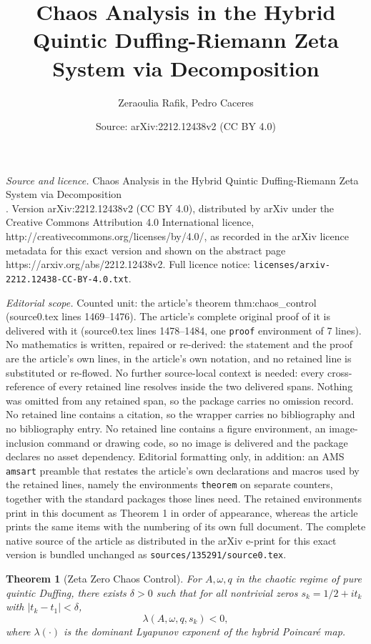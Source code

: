 \documentclass[10pt,a4paper]{amsart}
\title{Chaos Analysis in the Hybrid Quintic Duffing-Riemann Zeta System via Decomposition\\}
\author{Zeraoulia Rafik, Pedro Caceres}
\date{Source: arXiv:2212.12438v2 (CC BY 4.0)}
\newtheorem{theorem}{Theorem}
\begin{document}
\maketitle

\noindent\emph{Source and licence.} Chaos Analysis in the Hybrid Quintic Duffing-Riemann Zeta System via Decomposition\\. Version arXiv:2212.12438v2 (CC BY 4.0), distributed by arXiv under the Creative Commons Attribution 4.0 International licence, http://creativecommons.org/licenses/by/4.0/, as recorded in the arXiv licence metadata for this exact version and shown on the abstract page https://arxiv.org/abs/2212.12438v2. Full licence notice: \texttt{licenses/arxiv-2212.12438-CC-BY-4.0.txt}.\par\smallskip

\noindent\textit{Editorial scope.} Counted unit: the article's theorem thm:chaos\_control (source0.tex lines 1469--1476). The article's complete original proof of it is delivered with it (source0.tex lines 1478--1484, one \texttt{proof} environment of 7 lines). No mathematics is written, repaired or re-derived: the statement and the proof are the article's own lines, in the article's own notation, and no retained line is substituted or re-flowed.  No further source-local context is needed: every cross-reference of every retained line resolves inside the two delivered spans.  Nothing was omitted from any retained span, so the package carries no omission record.  No retained line contains a citation, so the wrapper carries no bibliography and no bibliography entry.  No retained line contains a figure environment, an image-inclusion command or drawing code, so no image is delivered and the package declares no asset dependency.  Editorial formatting only, in addition: an AMS \texttt{amsart} preamble that restates the article's own declarations and macros used by the retained lines, namely the environments \texttt{theorem} on separate counters, together with the standard packages those lines need.  The retained environments print in this document as Theorem 1 in order of appearance, whereas the article prints the same items with the numbering of its own full document.  The complete native source of the article as distributed in the arXiv e-print for this exact version is bundled unchanged as \texttt{sources/135291/source0.tex}.
\begin{theorem}[Zeta Zero Chaos Control]
\label{thm:chaos_control}
For $A,\omega,q$ in the chaotic regime of pure quintic Duffing, there exists $\delta>0$ such that for all nontrivial zeros $s_k=1/2+it_k$ with $|t_k-t_1|<\delta$,
\begin{equation}
\lambda(A,\omega,q,s_k)<0,
\end{equation}
where $\lambda(\cdot)$ is the dominant Lyapunov exponent of the hybrid Poincaré map.
\end{theorem}
\end{document}
